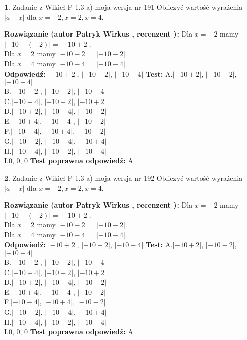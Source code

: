 \documentclass[12pt, a4paper]{article}
\theoremstyle{definition} %
\newtheorem{zad}{}
\newcommand{\zadStart}[1]{\begin{zad}#1\newline}
\newcommand{\zadStop}{\end{zad}}
\newcommand{\rozwStart}[2]{\noindent \textbf{Rozwiązanie (autor #1 , recenzent #2): }\newline}
\newcommand{\rozwStop}{\newline}
\newcommand{\odpStart}{\noindent \textbf{Odpowiedź:}\newline}
\newcommand{\odpStop}{\newline}
\newcommand{\testStart}{\noindent \textbf{Test:}\newline}
\newcommand{\testStop}{\newline}
\newcommand{\kluczStart}{\noindent \textbf{Test poprawna odpowiedź:}\newline}
\newcommand{\kluczStop}{\newline}
\begin{document}
\zadStart{Zadanie z Wikieł P 1.3 a) moja wersja nr 191}
Obliczyć wartość wyrażenia $|a - x|$ dla $x=-2,x=2,x=4$.
\zadStop
\rozwStart{Patryk Wirkus}{}
Dla $x = -2$ mamy $|-10 - (-2)| = |-10 + 2|$.\\
Dla $x = 2$ mamy $|-10 - 2| = |-10 - 2|$.\\
Dla $x = 4$ mamy $|-10 - 4| = |-10 - 4|$.\\
\rozwStop
\odpStart
$|-10 + 2|$, $|-10 - 2|$, $|-10 - 4|$
\odpStop
\testStart
A.$|-10 + 2|$, $|-10 - 2|$, $|-10 - 4|$\\
B.$|-10 - 2|$, $|-10 + 2|$, $|-10 - 4|$\\
C.$|-10 - 4|$, $|-10 - 2|$, $|-10 + 2|$\\
D.$|-10 + 2|$, $|-10 - 4|$, $|-10 - 2|$\\
E.$|-10 + 4|$, $|-10 - 4|$, $|-10 - 2|$\\
F.$|-10 - 4|$, $|-10 + 4|$, $|-10 - 2|$\\
G.$|-10 - 2|$, $|-10 - 4|$, $|-10 + 4|$\\
H.$|-10 + 4|$, $|-10 - 2|$, $|-10 - 4|$\\
I.$0$, $0$, $0$
\testStop
\kluczStart
A
\kluczStop



\zadStart{Zadanie z Wikieł P 1.3 a) moja wersja nr 192}
Obliczyć wartość wyrażenia $|a - x|$ dla $x=-2,x=2,x=4$.
\zadStop
\rozwStart{Patryk Wirkus}{}
Dla $x = -2$ mamy $|-10 - (-2)| = |-10 + 2|$.\\
Dla $x = 2$ mamy $|-10 - 2| = |-10 - 2|$.\\
Dla $x = 4$ mamy $|-10 - 4| = |-10 - 4|$.\\
\rozwStop
\odpStart
$|-10 + 2|$, $|-10 - 2|$, $|-10 - 4|$
\odpStop
\testStart
A.$|-10 + 2|$, $|-10 - 2|$, $|-10 - 4|$\\
B.$|-10 - 2|$, $|-10 + 2|$, $|-10 - 4|$\\
C.$|-10 - 4|$, $|-10 - 2|$, $|-10 + 2|$\\
D.$|-10 + 2|$, $|-10 - 4|$, $|-10 - 2|$\\
E.$|-10 + 4|$, $|-10 - 4|$, $|-10 - 2|$\\
F.$|-10 - 4|$, $|-10 + 4|$, $|-10 - 2|$\\
G.$|-10 - 2|$, $|-10 - 4|$, $|-10 + 4|$\\
H.$|-10 + 4|$, $|-10 - 2|$, $|-10 - 4|$\\
I.$0$, $0$, $0$
\testStop
\kluczStart
A
\kluczStop
\end{document}
